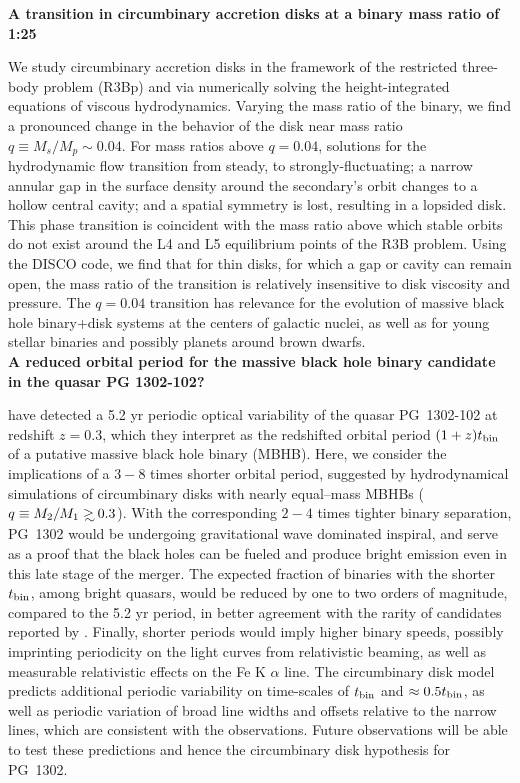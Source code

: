 \documentclass[12pt,letterpaper]{article}
\begin{document}
\noindent
\textbf{A transition in circumbinary accretion disks at a binary mass ratio of 1:25}

We study circumbinary accretion disks in the framework of the restricted
three-body problem (R3Bp) and via numerically solving the height-integrated
equations of viscous hydrodynamics. Varying the mass ratio of the binary, we
find a pronounced change in the behavior of the disk near mass ratio $q \equiv
M_s/M_p \sim 0.04$.  For mass ratios above $q=0.04$, solutions for the
hydrodynamic flow transition from steady, to strongly-fluctuating; a narrow
annular gap in the surface density around the secondary's orbit changes to a
hollow central cavity; and a spatial symmetry is lost, resulting in a lopsided
disk. This phase transition is coincident with the mass ratio above which
stable orbits do not exist around the L4 and L5 equilibrium points of the R3B
problem.  Using the DISCO code, we find that for thin disks, for which a gap
or cavity can remain open, the mass ratio of the transition is relatively
insensitive to disk viscosity and pressure.  The $q=0.04$ transition has
relevance for the evolution of massive black hole binary+disk systems at the
centers of galactic nuclei, as well as for young stellar binaries and possibly
planets around brown dwarfs.\\


\noindent
\textbf{A reduced orbital period for the massive black hole binary candidate in the quasar PG 1302-102?}

\cite{Graham+2015a} have detected a 5.2 yr periodic optical variability of the
quasar PG~1302-102 at redshift $z=0.3$, which they interpret as the redshifted
orbital period $(1+z)t_{\rm bin}$ of a putative massive black hole binary
(MBHB). Here, we consider the implications of a $3-8$ times shorter orbital
period, suggested by hydrodynamical simulations of circumbinary disks with
nearly equal--mass MBHBs ($q\equiv M_2/M_1\gsim 0.3$).  With the corresponding
$2-4$ times tighter binary separation, PG~1302 would be undergoing
gravitational wave dominated inspiral, and serve as a proof that the black
holes can be fueled and produce bright emission even in this late stage of the
merger. The expected fraction of binaries with the shorter $t_{\rm bin}$,
among bright quasars, would be reduced by one to two orders of magnitude,
compared to the 5.2 yr period, in better agreement with the rarity of
candidates reported by \cite{Graham+2015a}.  Finally, shorter periods would
imply higher binary speeds, possibly imprinting periodicity on the light
curves from relativistic beaming, as well as measurable relativistic effects
on the Fe K $\alpha$ line.  The circumbinary disk model predicts additional
periodic variability on time-scales of $t_{\rm bin}$ and $\approx 0.5 t_{\rm
bin}$, as well as periodic variation of broad line widths and offsets relative
to the narrow lines, which are consistent with the observations.  Future
observations will be able to test these predictions and hence the circumbinary
disk hypothesis for PG~1302.\\
\end{document}
